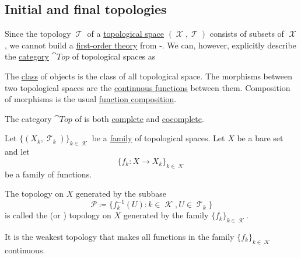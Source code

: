 \subsection{Initial and final topologies}\label{subsec:initial_final_topologies}

\begin{definition}\label{def:category_of_topological_spaces}
  Since the topology \( \mscrT \) of a \hyperref[def:topological_space]{topological space} \( (\mscrX, \mscrT) \) consists of subsets of \( \mscrX \), we cannot build a \hyperref[def:first_order_theory]{first-order theory} from -. We can, however, explicitly describe the \hyperref[def:category]{category} \( \cat{Top} \) of topological spaces as
  \begin{reflist}
     The \hyperref[def:set_zfc]{class} of objects is the class of all topological space.
     The morphisms between two topological spaces are the \hyperref[def:global_continuity]{continuous functions} between them.
     Composition of morphisms is the usual \hyperref[def:function/composition]{function composition}.
  \end{reflist}
\end{definition}

\begin{theorem}\label{thm:top_complete_cocomplete}
  The category \( \cat{Top} \) of is both \hyperref[def:categorical_limit]{complete} and \hyperref[def:categorical_colimit]{cocomplete}.
\end{theorem}

\begin{definition}\label{def:initial_topology}\mcite\cite{nLab:top}
  Let \( \{ (X_k, \mscrT_k) \}_{k \in \mscrK} \) be a \hyperref[def:indexed_family]{family} of topological spaces. Let \( X \) be a bare set and let
  \begin{equation*}
    \{ f_k: X \to X_k \}_{k \in \mscrK}
  \end{equation*}
  be a family of functions.

  The topology on \( X \) generated by the subbase
  \begin{equation*}
    \mathcal{P} \coloneqq \{ f_k^{-1}(U) \colon k \in \mscrK, U \in \mscrT_k \}
  \end{equation*}
  is called the  (or ) topology on \( X \) generated by the family \( \{ f_k \}_{k \in \mscrK} \).

  It is the weakest topology that makes all functions in the family \( \{ f_k \}_{k \in \mscrK} \) continuous.
\end{definition}

